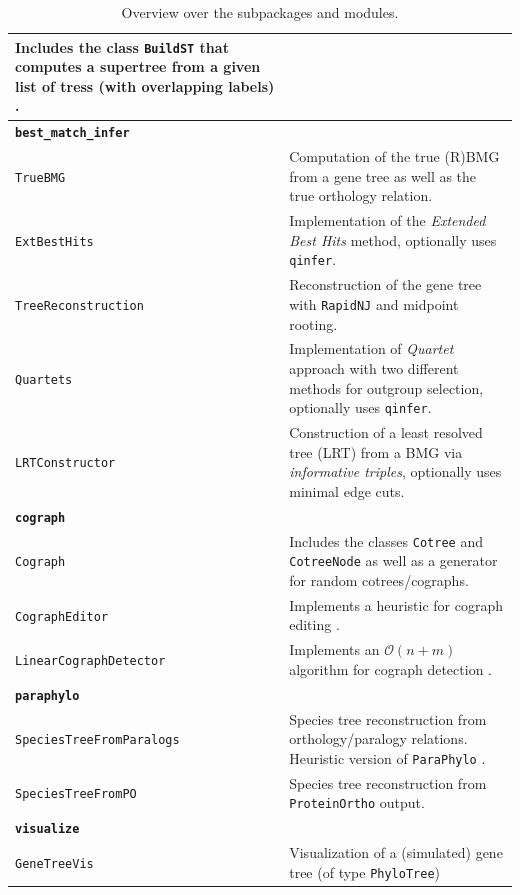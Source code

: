 \documentclass[hidelinks,11pt]{scrreprt}
\begin{document}
\begin{table}[H]
\begin{tabularx}{\textwidth}{|p{}|X|}
		Includes the class \texttt{BuildST} that computes a supertree from a given list of tress (with overlapping labels) \citep{deng2016}. \\
		\hline
		\multicolumn{2}{|l|}{\textbf{\texttt{best\_match\_infer}}}\\
		\hline
		\texttt{TrueBMG} & 
		Computation of the true (R)BMG from a gene tree as well as the true orthology relation. \\
		\texttt{ExtBestHits} & 
		Implementation of the \emph{Extended Best Hits} method, optionally uses \texttt{qinfer}. \\
		\texttt{TreeReconstruction} & 
		Reconstruction of the gene tree with \texttt{RapidNJ} \citep{simonsen2008} and midpoint rooting. \\
		\texttt{Quartets} & 
		Implementation of \emph{Quartet} approach with two different methods for outgroup selection, optionally uses \texttt{qinfer}. \\
		\texttt{LRTConstructor} & 
		Construction of a least resolved tree (LRT) from a BMG via \emph{informative triples}, optionally uses minimal edge cuts. \\
		\hline
		\multicolumn{2}{|l|}{\textbf{\texttt{cograph}}}\\
		\hline
		\texttt{Cograph} & 
		Includes the classes \texttt{Cotree} and \texttt{CotreeNode} as well as a generator for random cotrees/cographs. \\
		\texttt{CographEditor} & 
		Implements a heuristic for cograph editing \citep{crespelle2019}. \\
		\texttt{LinearCographDetector} & 
		Implements an $\mathcal{O}(n+m)$ algorithm for cograph detection \citep{corneil1985}. \\
		\hline
		\multicolumn{2}{|l|}{\textbf{\texttt{paraphylo}}}\\
		\hline
		\texttt{SpeciesTreeFromParalogs} & 
		Species tree reconstruction from orthology/paralogy relations. Heuristic version of \texttt{ParaPhylo} \cite{hellmuth2015}. \\
		\texttt{SpeciesTreeFromPO} & 
		Species tree reconstruction from \texttt{ProteinOrtho} \cite{lechner2011} output. \\
		\hline
		\multicolumn{2}{|l|}{\textbf{\texttt{visualize}}}\\
		\hline
		\texttt{GeneTreeVis} & 
		Visualization of a (simulated) gene tree (of type \texttt{PhyloTree}) \\
		\hline
	\end{tabularx}
	\caption{Overview over the subpackages and modules.}
	\label{tab:module_overview}
\end{table}
\end{document}

